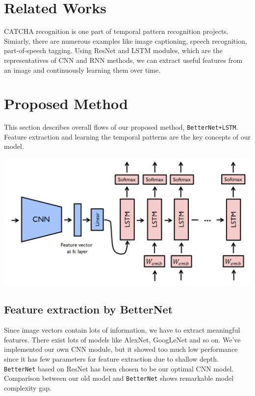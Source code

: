 \documentclass[10pt,twocolumn, letterpaper]{article}
\begin{document}
\section{Related Works}

CATCHA recognition is one part of temporal pattern recognition projects. Simiarly, there are numerous examples like image captioning, speech recognition, part-of-speech tagging. Using ResNet and LSTM modules, which are the representatives of CNN and RNN methods, we can extract useful features from an image and continuously learning them over time.

\section{Proposed Method}
This section describes overall flows of our proposed method, \texttt{BetterNet+LSTM}. Feature extraction and learning the temporal patterns are the key concepts of our model.

\begin{center}
\includegraphics[width=1\linewidth]{./model.jpg}
\end{center}

\subsection{Feature extraction by BetterNet}
Since image vectors contain lots of information, we have to extract meaningful features. There exist lots of models like AlexNet, GoogLeNet and so on. We've implemented our own CNN module, but it showed too much low performance since it has few parameters for feature extraction due to shallow depth. \texttt{BetterNet} based on ResNet has been chosen to be our optimal CNN model. Comparison between our old model and \texttt{BetterNet} shows remarkable model complexity gap.
\end{document}
